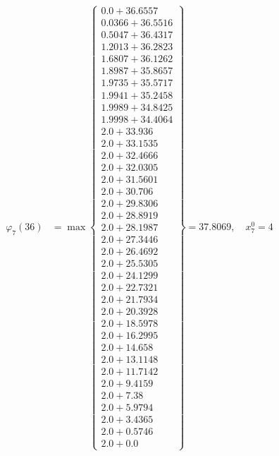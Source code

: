 \documentclass{article}
\begin{document}
\begin{align*}
  
\varphi_{7}(36) &= \max \left\{ \begin{array}{c}
0.0 + 36.6557 \\
 0.0366 + 36.5516 \\
 0.5047 + 36.4317 \\
 1.2013 + 36.2823 \\
 1.6807 + 36.1262 \\
 1.8987 + 35.8657 \\
 1.9735 + 35.5717 \\
 1.9941 + 35.2458 \\
 1.9989 + 34.8425 \\
 1.9998 + 34.4064 \\
 2.0 + 33.936 \\
 2.0 + 33.1535 \\
 2.0 + 32.4666 \\
 2.0 + 32.0305 \\
 2.0 + 31.5601 \\
 2.0 + 30.706 \\
 2.0 + 29.8306 \\
 2.0 + 28.8919 \\
 2.0 + 28.1987 \\
 2.0 + 27.3446 \\
 2.0 + 26.4692 \\
 2.0 + 25.5305 \\
 2.0 + 24.1299 \\
 2.0 + 22.7321 \\
 2.0 + 21.7934 \\
 2.0 + 20.3928 \\
 2.0 + 18.5978 \\
 2.0 + 16.2995 \\
 2.0 + 14.658 \\
 2.0 + 13.1148 \\
 2.0 + 11.7142 \\
 2.0 + 9.4159 \\
 2.0 + 7.38 \\
 2.0 + 5.9794 \\
 2.0 + 3.4365 \\
 2.0 + 0.5746 \\
 2.0 + 0.0
\end{array} \right\}=37.8069,\quad x_{7}^0=4\\
  
  
\end{align*}
\end{document}
